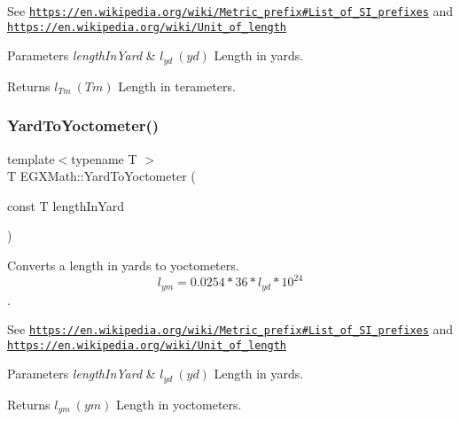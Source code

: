See \href{https://en.wikipedia.org/wiki/Metric_prefix#List_of_SI_prefixes}{\tt https\+://en.\+wikipedia.\+org/wiki/\+Metric\+\_\+prefix\#\+List\+\_\+of\+\_\+\+S\+I\+\_\+prefixes} and \href{https://en.wikipedia.org/wiki/Unit_of_length}{\tt https\+://en.\+wikipedia.\+org/wiki/\+Unit\+\_\+of\+\_\+length} 
\begin{DoxyParams}{Parameters}
{\em length\+In\+Yard} & $ l_{yd}\ (yd)$ Length in yards. \\
\hline
\end{DoxyParams}
\begin{DoxyReturn}{Returns}
$ l_{Tm}\ (Tm)$ Length in terameters. 
\end{DoxyReturn}
\mbox{\label{group___e_g_x_math-_conversions-_length_conversions-_imperial-_yard-_s_i_gaea3e0a85c92575480e68615b7e80d26f}} 
\subsubsection{\texorpdfstring{Yard\+To\+Yoctometer()}{YardToYoctometer()}}
{\footnotesize\ttfamily template$<$typename T $>$ \\
T E\+G\+X\+Math\+::\+Yard\+To\+Yoctometer (\begin{DoxyParamCaption}\item[{const T}]{length\+In\+Yard }\end{DoxyParamCaption})}



Converts a length in yards to yoctometers. \[ l_{ym}=0.0254 * 36 * l_{yd} * 10^{24} \]. 

See \href{https://en.wikipedia.org/wiki/Metric_prefix#List_of_SI_prefixes}{\tt https\+://en.\+wikipedia.\+org/wiki/\+Metric\+\_\+prefix\#\+List\+\_\+of\+\_\+\+S\+I\+\_\+prefixes} and \href{https://en.wikipedia.org/wiki/Unit_of_length}{\tt https\+://en.\+wikipedia.\+org/wiki/\+Unit\+\_\+of\+\_\+length} 
\begin{DoxyParams}{Parameters}
{\em length\+In\+Yard} & $ l_{yd}\ (yd)$ Length in yards. \\
\hline
\end{DoxyParams}
\begin{DoxyReturn}{Returns}
$ l_{ym}\ (ym)$ Length in yoctometers. 
\end{DoxyReturn}
\mbox{\label{group___e_g_x_math-_conversions-_length_conversions-_imperial-_yard-_s_i_ga746a9edfd1cf2828e2fa0d9dfccc22fd}} 
